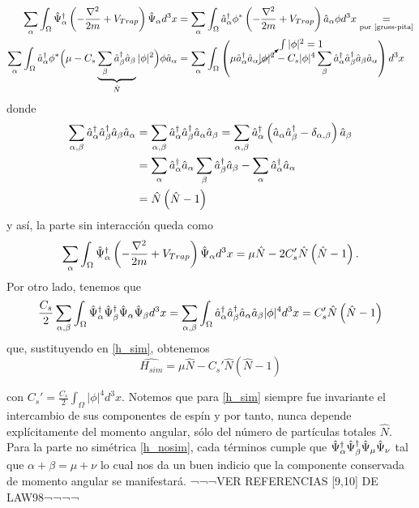 \begin{align*}
 \sum_\alpha \int_\Omega \hat{\Psi}^{\dagger}_\alpha \left( -\frac{\nabla^2}{2m} + V_{Trap} \right) \hat{\Psi}_{\alpha}d^3x &= \sum_\alpha \int_\Omega \hat{a}_{\alpha}^{\dagger} \phi^* \left( -\frac{\nabla^2}{2m} + V_{Trap} \right) \hat{a}_{\alpha} \phi d^3x \underset{\text{por \ref{gross-pita}}}{=} \\
\sum_\alpha \int_\Omega \hat{a}_{\alpha}^{\dagger} \phi^* \Big( \mu - C_s \underbrace{\sum_\beta \hat{a}_{\beta}^{\dagger}\hat{a}_{\beta}}_{\hat{N}} |\phi|^2 \Big) \phi \hat{a}_{\alpha} &= \sum_\alpha \int_\Omega \left( \mu\hat{a}_{\alpha}^{\dagger}\hat{a}_{\alpha} \cancelto{\int|\phi|^2 = 1}{|\phi|^2} - C_s|\phi|^4  \sum_\beta \hat{a}_{\alpha}^{\dagger} \hat{a}_{\beta}^{\dagger}\hat{a}_{\beta}\hat{a}_{\alpha} \right) d^3x 
\end{align*}
donde
\begin{align*}
\sum_{\alpha,\beta} \hat{a}_{\alpha}^{\dagger}\hat{a}_{\beta}^{\dagger}\hat{a}_{\beta}\hat{a}_{\alpha} & = \sum_{\alpha,\beta} \hat{a}_{\alpha}^{\dagger}\hat{a}_{\beta}^{\dagger}\hat{a}_{\alpha}\hat{a}_{\beta} = \sum_{\alpha,\beta} \hat{a}_{\alpha}^{\dagger} \left( \hat{a}_{\alpha}\hat{a}_{\beta}^{\dagger} - \delta_{\alpha,\beta} \right) \hat{a}_{\beta} \\
& = \sum_{\alpha} \hat{a}_{\alpha}^{\dagger}\hat{a}_{\alpha} \sum_\beta \hat{a}_{\beta}^{\dagger}\hat{a}_{\beta} - \sum_\alpha \hat{a}_{\alpha}^{\dagger}\hat{a}_{\alpha} \\ 
& = \hat{N}\left( \hat{N} - 1 \right)
\end{align*}
y así, la parte sin interacción queda como
\begin{align*}
\sum_\alpha \int_\Omega \hat{\Psi}^{\dagger}_\alpha \left( -\frac{\nabla^2}{2m} + V_{Trap} \right) \hat{\Psi}_{\alpha}d^3x = \mu \hat{N} - 2C_s'\hat{N}\left( \hat{N} - 1 \right).
\end{align*}
Por otro lado, tenemos que 
\begin{align*}
\frac{C_s}{2} \sum_{\alpha,\beta} \int_\Omega \hat{\Psi}^{\dagger}_\alpha\hat{\Psi}^{\dagger}_\beta\hat{\Psi}_{\alpha}\hat{\Psi}_{\beta} d^3x = \sum_{\alpha,\beta} \int_\Omega \hat{a}_{\alpha}^{\dagger}\hat{a}_{\beta}^{\dagger}\hat{a}_{\alpha}\hat{a}_{\beta} |\phi|^4 d^3x =  {C_s'} \hat{N}\left( \hat{N} - 1 \right)
\end{align*}
que, sustituyendo en \ref{h_sim}, obtenemos
\begin{equation}
\hat{H_{sim}} = \mu \hat{N} - C_s' \hat{N} \left( \hat{N} - 1 \right)
\end{equation}

con $C_s' = \frac{C_s}{2}\int_{\Omega}|\phi|^4d^3x$. Notemos que para \ref{h_sim} siempre fue invariante el intercambio de sus componentes de espín y por tanto, nunca depende explícitamente del momento angular, sólo del número de partículas totales $\hat{N}$. Para la parte no simétrica \ref{h_nosim}, cada términos cumple que $\hat{\Psi}^{\dagger}_\alpha\hat{\Psi}^{\dagger}_\beta\hat{\Psi}_{\mu}\hat{\Psi}_{\nu}$ tal que $\alpha + \beta = \mu + \nu$ lo cual nos da un buen indicio que la componente conservada de momento angular se manifestará. ¬¬¬VER REFERENCIAS [9,10] DE LAW98¬¬¬¬


